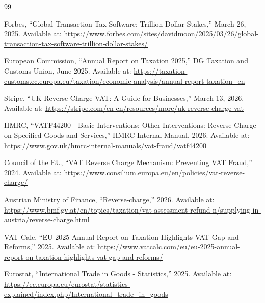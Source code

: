 \documentclass[11pt]{article}
\begin{document}
\begin{thebibliography}{99}

Forbes, ``Global Transaction Tax Software: Trillion-Dollar Stakes,'' March 26, 2025. 
Available at: \url{https://www.forbes.com/sites/davidmoon/2025/03/26/global-transaction-tax-software-trillion-dollar-stakes/}

European Commission, ``Annual Report on Taxation 2025,'' DG Taxation and Customs Union, June 2025.
Available at: \url{https://taxation-customs.ec.europa.eu/taxation/economic-analysis/annual-report-taxation_en}

Stripe, ``UK Reverse Charge VAT: A Guide for Businesses,'' March 13, 2026.
Available at: \url{https://stripe.com/en-cn/resources/more/uk-reverse-charge-vat}

HMRC, ``VATF44200 - Basic Interventions: Other Interventions: Reverse Charge on Specified Goods and Services,'' HMRC Internal Manual, 2026.
Available at: \url{https://www.gov.uk/hmrc-internal-manuals/vat-fraud/vatf44200}

Council of the EU, ``VAT Reverse Charge Mechanism: Preventing VAT Fraud,'' 2024.
Available at: \url{https://www.consilium.europa.eu/en/policies/vat-reverse-charge/}

Austrian Ministry of Finance, ``Reverse-charge,'' 2026.
Available at: \url{https://www.bmf.gv.at/en/topics/taxation/vat-assessment-refund-n/supplying-in-austria/reverse-charge.html}

VAT Calc, ``EU 2025 Annual Report on Taxation Highlights VAT Gap and Reforms,'' 2025.
Available at: \url{https://www.vatcalc.com/eu/eu-2025-annual-report-on-taxation-highlights-vat-gap-and-reforms/}

Eurostat, ``International Trade in Goods - Statistics,'' 2025.
Available at: \url{https://ec.europa.eu/eurostat/statistics-explained/index.php/International_trade_in_goods}

\end{thebibliography}
\end{document}
